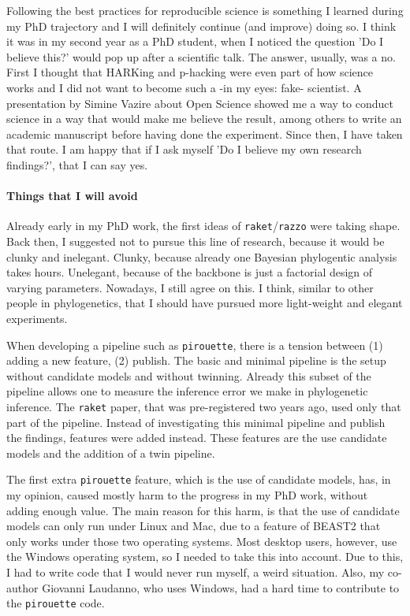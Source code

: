 Following the best practices for reproducible science is something
I learned during my PhD trajectory and I will definitely continue (and improve)
doing so. I think it was in my second year as a PhD student, 
when I noticed the question 'Do I believe this?' would pop up
after a scientific talk. The answer, usually, was a no. First I thought
that HARKing and p-hacking were even part of how science works
and I did not want to become such a -in my eyes: fake- scientist.
A presentation by Simine Vazire about Open Science showed me a way
to conduct science in a way that would make me believe the result,
among others to write an academic manuscript before having done
the experiment. Since then, I have taken that route. 
I am happy that if I ask myself 'Do I believe my own research findings?', 
that I can say yes.

\paragraph{Things that I will avoid} 

Already early in my PhD work, the first ideas of \verb;raket;/\verb;razzo; were
taking shape. Back then, I suggested not to pursue this line of
research, because it would be clunky and inelegant. Clunky, because
already one Bayesian phylogentic analysis takes hours. Unelegant,
because of the backbone is just a factorial design of varying
parameters. Nowadays, I still agree on this.
I think, similar to other people in phylogenetics,
that I should have pursued more light-weight and elegant experiments.

When developing a pipeline such as \verb;pirouette;, there is a tension
between (1) adding a new feature, (2) publish. The basic
and minimal pipeline is the setup without candidate models and without
twinning. Already this subset of the pipeline allows one to 
measure the inference error we make in phylogenetic inference.
The \verb;raket; paper, that was pre-registered two years ago, used only
that part of the pipeline. Instead of investigating this minimal
pipeline and publish the findings, features were added instead.
These features are the use candidate models and the addition
of a twin pipeline. 

The first extra \verb;pirouette; feature, which is the use of candidate models,
has, in my opinion, caused mostly harm to the progress in my PhD work, without adding
enough value. The main reason for this harm, is that the use of candidate
models can only run under Linux and Mac, due to a feature of BEAST2 that
only works under those two operating systems. Most desktop users, however,
use the Windows operating system, so I needed to take this into account.
Due to this, I had to write code that I would never run myself, a weird
situation. Also, my co-author Giovanni Laudanno, who uses Windows, had
a hard time to contribute to the \verb;pirouette; code. 

